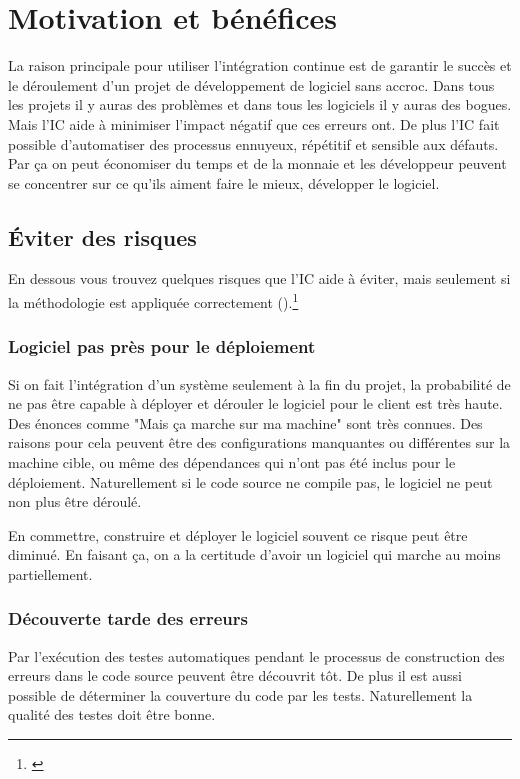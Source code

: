 \chapter{Motivation et bénéfices}

La raison principale pour utiliser l'intégration continue est de garantir le succès et le déroulement d'un projet de développement de logiciel sans accroc. Dans tous les projets il y auras des problèmes et dans tous les logiciels il y auras des bogues. Mais l'IC aide à minimiser l'impact négatif que ces erreurs ont. De plus l'IC fait possible d'automatiser des processus ennuyeux, répétitif et sensible aux défauts. Par ça on peut économiser du temps et de la monnaie et les développeur peuvent se concentrer sur ce qu'ils aiment faire le mieux, développer le logiciel.

\section{Éviter des risques}
En dessous vous trouvez quelques risques que l'IC aide à éviter, mais seulement si la méthodologie est appliquée correctement ().\footnote{\cite[p39]{duvallconint}} 
\subsection{Logiciel pas près pour le déploiement}
Si on fait l'intégration d'un système seulement à la fin du projet, la probabilité de ne pas être capable à déployer et dérouler le logiciel pour le client est très haute. Des énonces comme "Mais ça marche sur ma machine" sont très connues. Des raisons pour cela peuvent être des configurations manquantes ou différentes sur la machine cible, ou même des dépendances qui n'ont pas été inclus pour le déploiement. Naturellement si le code source ne compile pas, le logiciel ne peut non plus être déroulé.

En commettre, construire et déployer le logiciel souvent ce risque peut être diminué. En faisant ça, on a la certitude d'avoir un logiciel qui marche au moins partiellement.

\subsection{Découverte tarde des erreurs}
Par l'exécution des testes automatiques pendant le processus de construction des erreurs dans le code source peuvent être découvrit tôt. De plus il est aussi possible de déterminer la couverture du code par les tests. Naturellement la qualité des testes doit être bonne.


